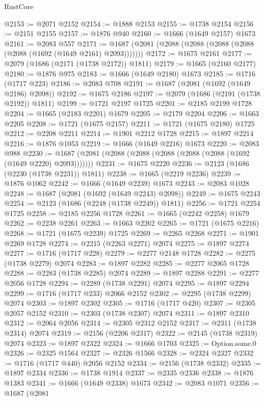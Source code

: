 \begin{lexlean}{RustCore}
\begin{coremodule}
@2153 := @2071 @2152
@2154 := @1888 @2153
@2155 := @1738 @2154
@2156 := @2151 @2155
@2157 := @1876 @940
@2160 := @1666 (@1649 @2157) @1673
@2161 := @2083 @557
@2171 := @1687 (@2081 (@2088 (@2088 (@2088 (@2088 (@2088 (@1692 (@1649 @2161) @2093)))))))
@2172 := @1675 @2161
@2177 := @2079 (@1686 (@2171 (@1738 @2172)) @1811)
@2179 := @1665 (@2160 @2177)
@2180 := @1876 @975
@2183 := @1666 (@1649 @2180) @1673
@2185 := @1716 (@1717 @223)
@2186 := @2083 @708
@2191 := @1687 (@2081 (@1692 (@1649 @2186) @2098))
@2192 := @1675 @2186
@2197 := @2079 (@1686 (@2191 (@1738 @2192)) @1811)
@2199 := @1721 @2197 @1725
@2201 := @2185 @2199 @1728
@2204 := @1665 (@2183 @2201) @1679
@2205 := @2179 @2204
@2206 := @1663 @2205
@2208 := @1721 (@1675 @2157)
@2211 := @1721 (@1675 @2180) @1725
@2212 := @2208 @2211
@2214 := @1901 @2212 @1728
@2215 := @1897 @2214
@2216 := @1876 @1053
@2219 := @1666 (@1649 @2216) @1673
@2220 := @2083 @988
@2230 := @1687 (@2081 (@2088 (@2088 (@2088 (@2088 (@2088 (@1692 (@1649 @2220) @2093)))))))
@2231 := @1675 @2220
@2236 := @2123 (@1686 (@2230 (@1738 @2231)) @1811)
@2238 := @1665 (@2219 @2236)
@2239 := @1876 @1062
@2242 := @1666 (@1649 @2239) @1673
@2243 := @2083 @1028
@2248 := @1687 (@2081 (@1692 (@1649 @2243) @2098))
@2249 := @1675 @2243
@2254 := @2123 (@1686 (@2248 (@1738 @2249)) @1811)
@2256 := @1721 @2254 @1725
@2258 := @2185 @2256 @1728
@2261 := @1665 (@2242 @2258) @1679
@2262 := @2238 @2261
@2263 := @1663 @2262
@2265 := @1721 (@1675 @2216)
@2268 := @1721 (@1675 @2239) @1725
@2269 := @2265 @2268
@2271 := @1901 @2269 @1728
@2274 := @2215 (@2263 @2271) @2074
@2275 := @1897 @2274
@2277 := @1716 (@1717 @228)
@2279 := @2277 @2148 @1728
@2282 := @2275 (@1738 @2279) @2074
@2283 := @1897 @2282
@2285 := @2277 @2065 @1728
@2288 := @2283 (@1738 @2285) @2074
@2289 := @1897 @2288
@2291 := @2277 @2056 @1728
@2294 := @2289 (@1738 @2291) @2074
@2295 := @1897 @2294
@2299 := @1716 (@1717 @233) @2066 @2152
@2302 := @2295 (@1738 @2299) @2074
@2303 := @1897 @2302
@2305 := @1716 (@1717 @420)
@2307 := @2305 @2057 @2152
@2310 := @2303 (@1738 @2307) @2074
@2311 := @1897 @2310
@2312 := @2064 @2056
@2314 := @2305 @2312 @2152
@2317 := @2311 (@1738 @2314) @2074
@2319 := @2156 (@2206 @2317)
@2322 := @2145 (@1738 @2319) @2074
@2323 := @1897 @2322
@2324 := @1666 @1703
@2325 := Option.some.{0}
@2326 := @2325 @1564
@2327 := @2326 @1566
@2328 := @2324 @2327
@2332 := @1716 (@1717 @440) @2056 @2152
@2334 := @2156 (@1738 @2332)
@2335 := @1897 @2334
@2336 := @1738 @1914
@2337 := @2335 @2336
@2338 := @1876 @1383
@2341 := @1666 (@1649 @2338) @1673
@2342 := @2083 @1071
@2356 := @1687
    (@2081

\end{coremodule}
\end{lexlean}
